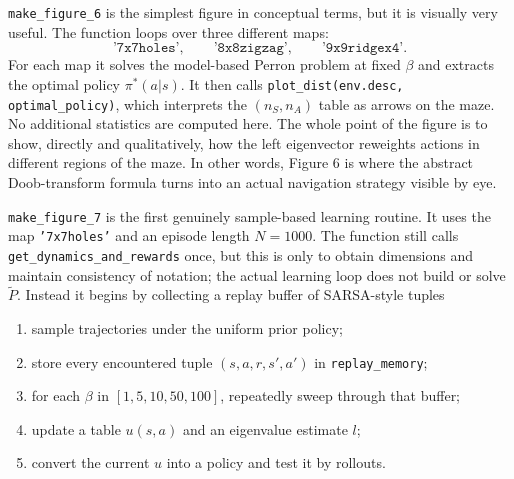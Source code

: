 \documentclass[11pt]{article}
\begin{document}
\medskip
\texttt{make\_figure\_6} is the simplest figure in conceptual terms, but it is visually very
useful. The function loops over three different maps:
\begin{equation}
    \texttt{'7x7holes'},\qquad
    \texttt{'8x8zigzag'},\qquad
    \texttt{'9x9ridgex4'}.
\end{equation}
For each map it solves the model-based Perron problem at fixed \(\beta\) and extracts the
optimal policy \(\pi^*(a|s)\). It then calls \texttt{plot\_dist(env.desc, optimal\_policy)},
which interprets the \((n_S,n_A)\) table as arrows on the maze. No additional statistics are
computed here. The whole point of the figure is to show, directly and qualitatively, how the
left eigenvector reweights actions in different regions of the maze. In other words, Figure 6
is where the abstract Doob-transform formula turns into an actual navigation strategy visible
by eye.

\medskip
\texttt{make\_figure\_7} is the first genuinely sample-based learning routine. It uses the map
\texttt{'7x7holes'} and an episode length \(N=1000\). The function still calls
\texttt{get\_dynamics\_and\_rewards} once, but this is only to obtain dimensions and maintain
consistency of notation; the actual learning loop does not build or solve \(\widetilde P\).
Instead it begins by collecting a replay buffer of SARSA-style tuples
\begin{enumerate}
    \item sample trajectories under the uniform prior policy;
    \item store every encountered tuple \((s,a,r,s',a')\) in \texttt{replay\_memory};
    \item for each \(\beta\) in \([1,5,10,50,100]\), repeatedly sweep through that buffer;
    \item update a table \(u(s,a)\) and an eigenvalue estimate \(l\);
    \item convert the current \(u\) into a policy and test it by rollouts.
\end{enumerate}
\end{document}
